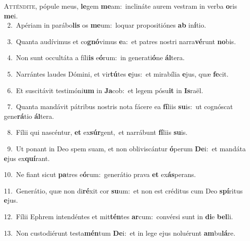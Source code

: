 \lettrine{\initial\textcolor{\initialcolor}{A}}{tténdite,} pópule meus, \textbf{le}\-gem \textbf{me}\-am:~\star inclináte aurem vestram in verba \textbf{o}\-ris \textbf{me}\-i.\\
{\numbfont\textcolor{\numbcolor}{~2.}}~Apériam in parábo\textbf{lis} os \textbf{me}\-um:~\star loquar propositiónes \textbf{ab} in\-\textbf{í}\-tio.\par
{\numbfont\textcolor{\numbcolor}{~3.}}~Quanta audívimus et co\-\textbf{gnó}\-vimus \textbf{e}\-a:~\star et patres nostri narra\-\textbf{vé}\-runt \textbf{no}\-bis.\par
{\numbfont\textcolor{\numbcolor}{~4.}}~Non sunt occultáta a fíli\textbf{is} e\-\textbf{ó}\-rum:~\star in generati\-\textbf{ó}\-ne \textbf{ál}\-tera.\par
{\numbfont\textcolor{\numbcolor}{~5.}}~Narrántes laudes Dómini, et vir\-\textbf{tú}\-tes \textbf{e}\-jus:~\star et mirabília \textbf{e}\-jus, quæ \textbf{fe}\-cit.\par
{\numbfont\textcolor{\numbcolor}{~6.}}~Et suscitávit testimóni\textbf{um} in \textbf{Ja}\-cob:~\star et legem pósu\textbf{it} in \textbf{Is}\-raël.\par
{\numbfont\textcolor{\numbcolor}{~7.}}~Quanta mandávit pátribus nostris nota fácere ea \textbf{fí}\-liis \textbf{su}\-is:~\star ut cognóscat gene\-\textbf{rá}\-tio \textbf{ál}\-tera.\par
{\numbfont\textcolor{\numbcolor}{~8.}}~Fílii qui nascéntur, \textbf{et} ex\-\textbf{súr}\-gent,~\star et narrábunt \textbf{fí}\-liis \textbf{su}\-is.\par
{\numbfont\textcolor{\numbcolor}{~9.}}~Ut ponant in Deo spem suam, et non obliviscántur \textbf{ó}\-perum \textbf{De}\-i:~\star et mandáta \textbf{e}\-jus ex\-\textbf{quí}\-rant.\par
{\numbfont\textcolor{\numbcolor}{10.}}~Ne fiant sicut \textbf{pa}\-tres e\-\textbf{ó}\-rum:~\star generátio prava \textbf{et} ex\-\textbf{ás}\-perans.\par
{\numbfont\textcolor{\numbcolor}{11.}}~Generátio, quæ non di\-\textbf{ré}\-xit cor \textbf{su}\-um:~\star et non est créditus cum Deo \textbf{spí}\-ritus \textbf{e}\-jus.\par
{\numbfont\textcolor{\numbcolor}{12.}}~Fílii Ephrem intendéntes et mit\-\textbf{tén}\-tes \textbf{ar}\-cum:~\star convérsi sunt in \textbf{di}\-e \textbf{bel}\-li.\par
{\numbfont\textcolor{\numbcolor}{13.}}~Non custodiérunt testa\-\textbf{mén}\-tum \textbf{De}\-i:~\star et in lege ejus noluérunt \textbf{am}\-bu\-\textbf{lá}\-re.\par
